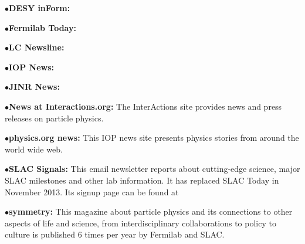 \item{$\bullet$}{\bf DESY inForm:}
	\item{}
\medskip

\item{$\bullet$}{\bf Fermilab Today:}
	\item{}
\medskip

\item{$\bullet$}{\bf LC Newsline:}
	\item{}
	\item{}
\medskip

\item{$\bullet$}{\bf IOP News:}
     \item{}


\item{$\bullet$}{\bf JINR News:}
 \item{}

\medskip

\item{$\bullet$}{\bf News at Interactions.org:}
The InterActions site provides news and press releases on particle physics.
     \item{}
     \item{}

\medskip

\item{$\bullet$}{\bf physics.org news:}
This IOP news site presents physics stories from around the world wide web.
     \item{}


\item{$\bullet$}{\bf SLAC Signals:}
This email newsletter reports about cutting-edge science, major SLAC milestones and other lab information. It has replaced SLAC Today in November 2013. Its signup page can be found at 
	\item{}


\medskip

\item{$\bullet$}{\bf symmetry:}
This magazine about particle physics and its connections to other aspects of life and science, from interdisciplinary collaborations to policy to culture is published 6 times per year by Fermilab and SLAC.
     \item{}
     \item{}

